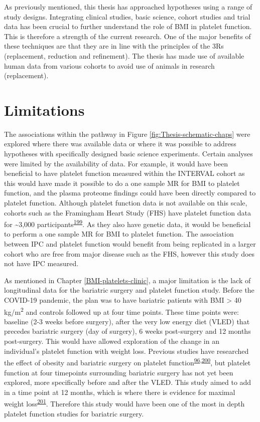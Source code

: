 \documentclass[11pt,twoside]{bristolthesis}
\begin{document}
As previously mentioned, this thesis has approached hypotheses using a range of study designs. Integrating clinical studies, basic science, cohort studies and trial data has been crucial to further understand the role of BMI in platelet function. This is therefore a strength of the current research. One of the major benefits of these techniques are that they are in line with the principles of the 3Rs (replacement, reduction and refinement). The thesis has made use of available human data from various cohorts to avoid use of animals in research (replacement).

\hypertarget{limitations}{%
\section{Limitations}\label{limitations}}

The associations within the pathway in Figure \ref{fig:Thesis-schematic-chaps} were explored where there was available data or where it was possible to address hypotheses with specifically designed basic science experiments. Certain analyses were limited by the availability of data. For example, it would have been beneficial to have platelet function measured within the INTERVAL cohort as this would have made it possible to do a one sample MR for BMI to platelet function, and the plasma proteome findings could have been directly compared to platelet function. Although platelet function data is not available on this scale, cohorts such as the Framingham Heart Study (FHS) have platelet function data for \textasciitilde3,000 participants\textsuperscript{\protect\hyperlink{ref-Rodriguez2020}{199}}. As they also have genetic data, it would be beneficial to perform a one sample MR for BMI to platelet function. The association between IPC and platelet function would benefit from being replicated in a larger cohort who are free from major disease such as the FHS, however this study does not have IPC measured.

As mentioned in Chapter \ref{BMI-platelets-clinic}, a major limitation is the lack of longitudinal data for the bariatric surgery and platelet function study. Before the COVID-19 pandemic, the plan was to have bariatric patients with BMI \textgreater{} 40 kg/m\textsuperscript{2} and controls followed up at four time points. These time points were: baseline (2-3 weeks before surgery), after the very low energy diet (VLED) that precedes bariatric surgery (day of surgery), 6 weeks post-surgery and 12 months post-surgery. This would have allowed exploration of the change in an individual's platelet function with weight loss. Previous studies have researched the effect of obesity and bariatric surgery on platelet function\textsuperscript{\protect\hyperlink{ref-Barrachina2019}{96},\protect\hyperlink{ref-Dobrydneva2012}{200}}, but platelet function at four timepoints surrounding bariatric surgery has not yet been explored, more specifically before and after the VLED. This study aimed to add in a time point at 12 months, which is where there is evidence for maximal weight loss\textsuperscript{\protect\hyperlink{ref-Maciejewski2016}{201}}. Therefore this study would have been one of the most in depth platelet function studies for bariatric surgery.
\end{document}
